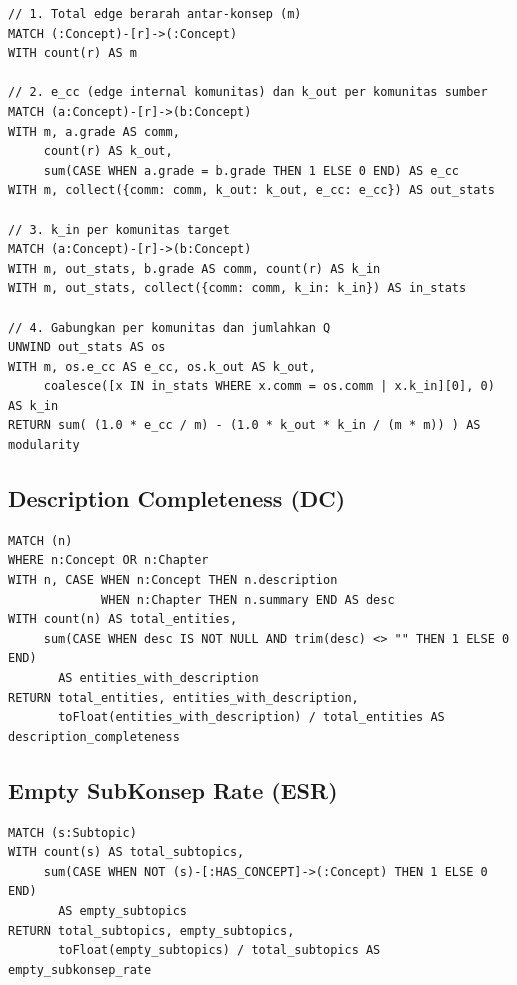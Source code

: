 \documentclass[main]{subfiles}
\begin{document}
\begin{lstlisting}[style=cypherbox,caption={Modularity berarah dengan partisi tetap = mata pelajaran.},label={lst:cypher-modularity}]
// 1. Total edge berarah antar-konsep (m)
MATCH (:Concept)-[r]->(:Concept)
WITH count(r) AS m

// 2. e_cc (edge internal komunitas) dan k_out per komunitas sumber
MATCH (a:Concept)-[r]->(b:Concept)
WITH m, a.grade AS comm,
     count(r) AS k_out,
     sum(CASE WHEN a.grade = b.grade THEN 1 ELSE 0 END) AS e_cc
WITH m, collect({comm: comm, k_out: k_out, e_cc: e_cc}) AS out_stats

// 3. k_in per komunitas target
MATCH (a:Concept)-[r]->(b:Concept)
WITH m, out_stats, b.grade AS comm, count(r) AS k_in
WITH m, out_stats, collect({comm: comm, k_in: k_in}) AS in_stats

// 4. Gabungkan per komunitas dan jumlahkan Q
UNWIND out_stats AS os
WITH m, os.e_cc AS e_cc, os.k_out AS k_out,
     coalesce([x IN in_stats WHERE x.comm = os.comm | x.k_in][0], 0) AS k_in
RETURN sum( (1.0 * e_cc / m) - (1.0 * k_out * k_in / (m * m)) ) AS modularity
\end{lstlisting}

\subsection{Description Completeness (DC)}

\begin{lstlisting}[style=cypherbox,caption={DC atas node :Concept (deskripsi) dan :Chapter (ringkasan).},label={lst:cypher-dc}]
MATCH (n)
WHERE n:Concept OR n:Chapter
WITH n, CASE WHEN n:Concept THEN n.description
             WHEN n:Chapter THEN n.summary END AS desc
WITH count(n) AS total_entities,
     sum(CASE WHEN desc IS NOT NULL AND trim(desc) <> "" THEN 1 ELSE 0 END)
       AS entities_with_description
RETURN total_entities, entities_with_description,
       toFloat(entities_with_description) / total_entities AS description_completeness
\end{lstlisting}

\subsection{Empty SubKonsep Rate (ESR)}

\begin{lstlisting}[style=cypherbox,caption={ESR: proporsi :Subtopic tanpa anak :Concept.},label={lst:cypher-esr}]
MATCH (s:Subtopic)
WITH count(s) AS total_subtopics,
     sum(CASE WHEN NOT (s)-[:HAS_CONCEPT]->(:Concept) THEN 1 ELSE 0 END)
       AS empty_subtopics
RETURN total_subtopics, empty_subtopics,
       toFloat(empty_subtopics) / total_subtopics AS empty_subkonsep_rate
\end{lstlisting}
\end{document}

